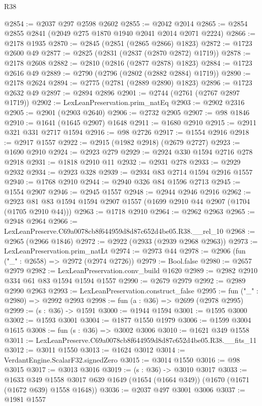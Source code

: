 \begin{lexlean}{R38}
\begin{coremodule}
@2854 := @2037 @297 @2598 @2602
@2855 := @2042 @2014
@2865 := @2854 @2855 @2841 (@2049 @275 @1870 @1940 @2041 @2014 @2071 @2224)
@2866 := @2178 @1935
@2870 := @2845 (@2851 (@2865 @2866) @1823)
@2872 := @1723 @2600 @49
@2877 := @2825 (@2831 (@2837 (@2870 @2872) @1719))
@2878 := @2178 @2608
@2882 := @2810 (@2816 (@2877 @2878) @1823)
@2884 := @1723 @2616 @49
@2889 := @2790 (@2796 (@2802 (@2882 @2884) @1719))
@2890 := @2178 @2624
@2894 := @2775 (@2781 (@2889 @2890) @1823)
@2896 := @1723 @2632 @49
@2897 := @2894 @2896
@2901 := @2744 (@2761 (@2767 @2897 @1719))
@2902 := LexLeanPreservation.prim_natEq
@2903 := @2902 @2316
@2905 := @2901 (@2903 @2640)
@2906 := @2732 @2905
@2907 := @98 @1846
@2910 := @1641 (@1645 @2907) @1648
@2911 := @1680 @2910
@2915 := @2911 @321 @331 @2717 @1594
@2916 := @98 @2726
@2917 := @1554 @2916
@2918 := @2917 @1557
@2922 := @2915 (@1982 @2918) (@2679 @2727)
@2923 := @1690 @2910
@2924 := @2923 @279
@2929 := @2924 @330 @1594 @2716 @278 @2918
@2931 := @1818 @2910 @11
@2932 := @2931 @278
@2933 := @2929 @2932
@2934 := @2923 @328
@2939 := @2934 @83 @2714 @1594 @2916 @1557
@2940 := @1768 @2910
@2944 := @2940 @326 @84 @1596 @2713
@2945 := @1554 @2907
@2946 := @2945 @1557
@2948 := @2944 @2946 @2916
@2962 := @2923 @81 @83 @1594 @1594 @2907 @1557 (@1699 @2910 @44 @2907 (@1704 (@1705 @2910 @44)))
@2963 := @1718 @2910
@2964 := @2962 @2963
@2965 := @2948 @2964
@2966 := LexLeanPreserve.C69a0078cb8f644959d8d87c652d4be05.R38.__rel_10
@2968 := @2965 (@2966 @1846)
@2972 := @2922 (@2933 (@2939 @2968 @2963))
@2973 := LexLeanPreservation.prim_natLt
@2974 := @2973 @44
@2978 := @2906 (fun ("_" : @2658) => @2972 (@2974 @2726))
@2979 := Bool.false
@2980 := @2657 @2979
@2982 := LexLeanPreservation.conv_build @1620
@2989 := @2982 @2910 @334 @61 @83 @1594 @1594 @1557
@2990 := @2679 @2979
@2992 := @2989 @2990 @2963
@2993 := LexLeanPreservation.construct_false
@2995 := fun ("_" : @2980) => @2992 @2993
@2998 := fun (a : @36) => @2699 (@2978 @2995)
@2999 := (s : @36) -> @1591
@3000 := @1944 @1594
@3001 := @1595 @3000
@3002 := @1593 @3001
@3004 := @1877 @1550 @1979
@3006 := @1599 @3004 @1615
@3008 := fun (s : @36) => @3002 @3006
@3010 := @1621 @349 @1558
@3011 := LexLeanPreserve.C69a0078cb8f644959d8d87c652d4be05.R38.__fits_11
@3012 := @3011 @1550
@3013 := @1624 @3012
@3014 := VerdantEngine.ScalarF32.signedZero
@3015 := @3014 @1550
@3016 := @98 @3015
@3017 := @3013 @3016
@3019 := (s : @36) -> @3010 @3017
@3033 := @1633
    @349
    @1558
    @3017
    @639
    @1649
    (@1654 (@1664 @349))
    (@1670 (@1671 (@1672 @639) @1558 @1648))
@3036 := @2037 @497 @3001 @3006
@3037 := @1981 @1557

\end{coremodule}
\end{lexlean}
